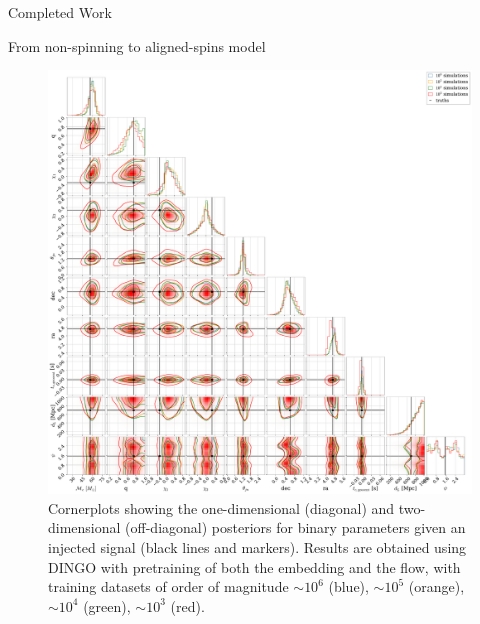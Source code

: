 \documentclass[11pt,a4paper,oneside]{book}
\numberwithin{equation}{chapter}
\numberwithin{table}{chapter}
\numberwithin{figure}{chapter}
\begin{document}
\begin{chapter}{Completed Work}
\begin{section}{From non-spinning to aligned-spins model}
\begin{figure}
\includegraphics[width=1.1\columnwidth]{figures/cornerplots.pdf}
\caption{Cornerplots showing the one-dimensional (diagonal) and two-dimensional (off-diagonal) posteriors for binary parameters given an injected signal (black lines and markers). Results are obtained using DINGO with pretraining of both the embedding and the flow, with training datasets of order of magnitude $\sim10^{6}$ (blue), $\sim10^{5}$ (orange), $\sim10^{4}$ (green), $\sim10^{3}$ (red).}
\label{cp}
\end{figure}


\end{section}
\end{chapter}
\end{document}
